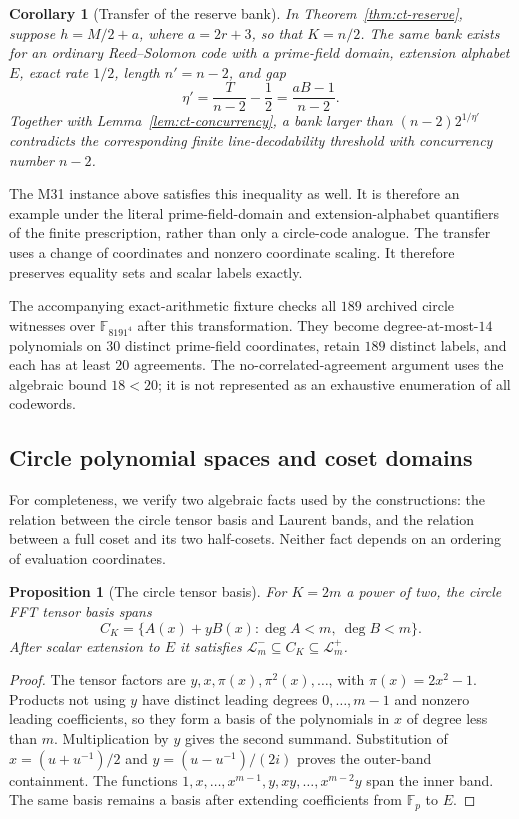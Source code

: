 \documentclass[11pt,letterpaper]{article}
\newtheorem{proposition}[theorem]{Proposition}
\newtheorem{corollary}[theorem]{Corollary}
\theoremstyle{definition}
\theoremstyle{remark}
\begin{document}
\begin{corollary}[Transfer of the reserve bank]
\label{cor:ct-transfer-reserve}
In Theorem~\ref{thm:ct-reserve}, suppose $h=M/2+a$, where $a=2r+3$,
so that $K=n/2$. The same bank exists for an ordinary Reed--Solomon
code with a prime-field domain, extension alphabet $E$, exact rate
$1/2$, length $n'=n-2$, and gap
\[
 \eta'=\frac{T}{n-2}-\frac12=\frac{aB-1}{n-2}.
\]
Together with Lemma~\ref{lem:ct-concurrency}, a bank larger than
$(n-2)2^{1/\eta'}$ contradicts the corresponding finite
line-decodability threshold with concurrency number $n-2$.
\end{corollary}

The M31 instance above satisfies this inequality as well. It is therefore
an example under the literal prime-field-domain and extension-alphabet
quantifiers of the finite prescription, rather than only a circle-code
analogue. The transfer uses a change of coordinates and nonzero coordinate
scaling. It therefore preserves equality sets and scalar labels exactly.

The accompanying exact-arithmetic fixture checks all $189$ archived
circle witnesses over $\mathbb F_{8191^4}$ after this transformation. They
become degree-at-most-$14$ polynomials on $30$ distinct prime-field
coordinates, retain $189$ distinct labels, and each has at least $20$
agreements. The no-correlated-agreement argument uses the algebraic bound
$18<20$; it is not represented as an exhaustive enumeration of all codewords.

\subsection{Circle polynomial spaces and coset domains}
\label{sec:ct-source}

For completeness, we verify two algebraic facts used by the
constructions: the relation between the circle tensor basis and Laurent
bands, and the relation between a full coset and its two half-cosets.
Neither fact depends on an ordering of evaluation coordinates.

\begin{proposition}[The circle tensor basis]
\label{prop:ct-fft-space}
For $K=2m$ a power of two, the circle FFT tensor basis spans
\[
 C_K=\{A(x)+yB(x):\deg A<m,\ \deg B<m\}.
\]
After scalar extension to $E$ it satisfies
$\mathcal L^-_m\subseteq C_K\subseteq\mathcal L^+_m$.
\end{proposition}
\begin{proof}
The tensor factors are $y,x,\pi(x),\pi^2(x),\ldots$, with
$\pi(x)=2x^2-1$. Products not using $y$ have distinct leading degrees
$0,\ldots,m-1$ and nonzero leading coefficients, so they form a basis
of the polynomials in $x$ of degree less than $m$. Multiplication by
$y$ gives the second summand. Substitution of
$x=(u+u^{-1})/2$ and $y=(u-u^{-1})/(2i)$ proves the outer-band
containment. The functions
$1,x,\ldots,x^{m-1},y,xy,\ldots,x^{m-2}y$ span the inner band.
The same basis remains a basis after extending coefficients from
$\mathbb F_p$ to $E$.
\end{proof}
\end{document}
